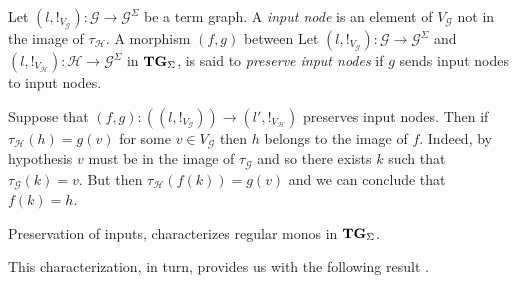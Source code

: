 \documentclass[runningheads,envcountsect]{lipics-v2021}
\newcommand{\catname}[1]{\textbf{\textup{#1}}}
\newcommand{\hyp}{\catname{Hyp}}
\newcommand{\tg}[0]{\catname{TG}_{\Sigma}}
\begin{document}
\begin{definition}
	Let $(l, !_{V_{\mathcal{G}}})\colon \mathcal{G}\to \mathcal{G}^{\Sigma}$  be a term graph. A \emph{input node} is an element of $V_{\mathcal{G}}$ not in the image of $\tau_{\mathcal{H}}$.  A morphism $(f,g)$ between
	Let $(l, !_{V_{\mathcal{G}}})\colon \mathcal{G}\to \mathcal{G}^{\Sigma}$ and $(l, !_{V_{\mathcal{H}}})\colon \mathcal{H}\to \mathcal{G}^{\Sigma}$ in $\tg$, is said to \emph{preserve input nodes} if $g$ sends input nodes to input nodes.
\end{definition}

\begin{remark}\label{prop:image}
	Suppose that $(f,g)\colon ((l, !_{V_{\mathcal{G}}}))\to (l', !_{V_{\mathcal{H}}})$ preserves input nodes. Then  if $\tau_{\mathcal{H}}(h)=g(v)$ for some $v\in V_{\mathcal{G}}$ then $h$ belongs to the image of $f$. Indeed, by hypothesis $v$ must be in the image of $\tau_{\mathcal{G}}$ and so there exists $k$ such that $\tau_{\mathcal{G}}(k)=v$. But then $\tau_{\mathcal{H}}(f(k))=g(v)$ and we can conclude that $f(k)=h$.
\end{remark}

Preservation of inputs, characterizes regular monos in $\tg$.


This characterization, in turn, provides us with the following result \cite{castelnovo2022newcriterionmathcalmmathcalnadhesivity,castelnovo2023thesis}. 

\end{document}
